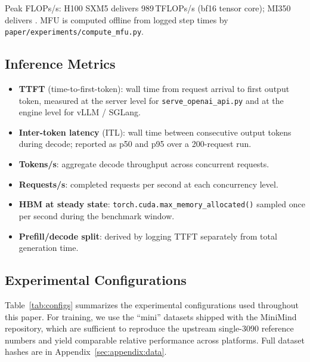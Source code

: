 Peak FLOPs/s: H100 SXM5 delivers 989\,TFLOPs/s (bf16 tensor core);
MI350 delivers .
MFU is computed offline from logged step times by
\texttt{paper/experiments/compute\_mfu.py}.

\subsection{Inference Metrics}
\label{sec:methodology:inf}

\begin{itemize}[leftmargin=*]
  \item \textbf{TTFT} (time-to-first-token): wall time from request arrival to
    first output token, measured at the server level for
    \texttt{serve\_openai\_api.py} and at the engine level for vLLM / SGLang.
  \item \textbf{Inter-token latency} (ITL): wall time between consecutive output
    tokens during decode; reported as p50 and p95 over a 200-request run.
  \item \textbf{Tokens/s}: aggregate decode throughput across concurrent
    requests.
  \item \textbf{Requests/s}: completed requests per second at each concurrency
    level.
  \item \textbf{HBM at steady state}: \texttt{torch.cuda.max\_memory\_allocated()}
    sampled once per second during the benchmark window.
  \item \textbf{Prefill/decode split}: derived by logging TTFT separately from
    total generation time.
\end{itemize}

\subsection{Experimental Configurations}
\label{sec:methodology:configs}

Table~\ref{tab:configs} summarizes the experimental configurations used
throughout this paper.  For training, we use the ``mini'' datasets shipped with
the MiniMind repository, which are sufficient to reproduce the upstream
single-3090 reference numbers and yield comparable relative performance across
platforms.  Full dataset hashes are in Appendix~\ref{sec:appendix:data}.

